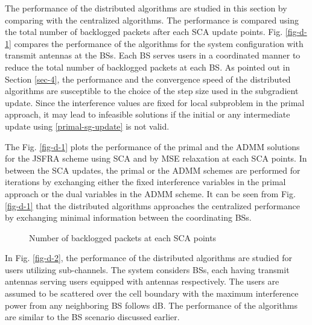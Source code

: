 
The performance of the distributed algorithms are studied in this section by comparing with the centralized algorithms. The performance is compared using the total number of backlogged packets after each \ac{SCA} update points. Fig. \ref{fig-d-1} compares the performance of the algorithms for the system configuration  with  transmit antennas at the \acp{BS}. Each \ac{BS} serves  users in a coordinated manner to reduce the total number of backlogged packets at each \ac{BS}. As pointed out in Section \ref{sec-4}, the performance and the convergence speed of the distributed algorithms are susceptible to the choice of the step size used in the subgradient update. Since the interference values are fixed for local subproblem in the primal approach, it may lead to infeasible solutions if the initial or any intermediate update using \eqref{primal-sg-update} is not valid.

The Fig. \ref{fig-d-1} plots the performance of the primal and the \ac{ADMM} solutions for the \ac{JSFRA} scheme using \ac{SCA} and by \ac{MSE} relaxation at each \ac{SCA} points. In between the \ac{SCA} updates, the primal or the \ac{ADMM} schemes are performed for  iterations by exchanging either the fixed interference variables in the primal approach or the dual variables in the \ac{ADMM} scheme. It can be seen from Fig. \ref{fig-d-1} that the distributed algorithms approaches the centralized performance by exchanging minimal information between the coordinating \acp{BS}.
\begin{figure*}
\centering
{}
\hfill
{}
\caption{Number of backlogged packets at each \ac{SCA} points}
\label{fig-d}
\end{figure*}

In Fig. \ref{fig-d-2}, the performance of the distributed algorithms are studied for  users utilizing  sub-channels. The system considers  \acp{BS}, each having  transmit antennas serving  users equipped with  antennas respectively. The users are assumed to be scattered over the cell boundary with the maximum interference power from any neighboring \ac{BS} follows \me{[0,-6]} dB. The performance of the algorithms are similar to the  \ac{BS} scenario discussed earlier.

